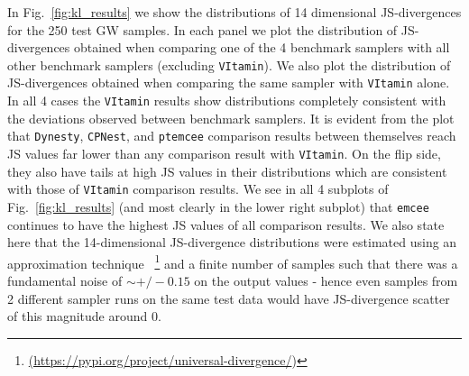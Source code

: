 %
%
In Fig.~\ref{fig:kl_results} we show the distributions of 14 
dimensional \ac{JS}-divergences 
for the 250 test \ac{GW} samples. In each panel we plot the 
distribution of \ac{JS}-divergences 
obtained when comparing one of the 4 benchmark samplers 
with all other benchmark samplers 
(excluding \texttt{VItamin}). We also plot the 
distribution of \ac{JS}-divergences obtained 
when comparing the same sampler with \texttt{VItamin} 
alone. In all 4 cases the \texttt{VItamin} 
results show distributions completely consistent with the 
deviations observed between 
benchmark samplers. It is evident from the plot 
that \texttt{Dynesty}, \texttt{CPNest}, 
and \texttt{ptemcee} comparison results between themselves reach 
\ac{JS} values far lower than any comparison result with \texttt{VItamin}. 
On the flip side, they also have tails at high \ac{JS} values 
in their distributions which are consistent with 
those of \texttt{VItamin} comparison results. We see in all 4 subplots 
of Fig.~\ref{fig:kl_results} (and most clearly in the lower right subplot) 
that \texttt{emcee} continues to have the highest \ac{JS} values of 
all comparison results.
We also state here that the 14-dimensional 
\ac{JS}-divergence distributions were estimated using an 
approximation technique
~\footnote{\url{(https://pypi.org/project/universal-divergence/})} 
and a finite number of samples such that there was a 
fundamental noise of $\sim +/- 0.15$ on the output values - 
hence even samples from 2 different sampler runs on the same 
test data would have \ac{JS}-divergence scatter of this 
magnitude around 0. ~

